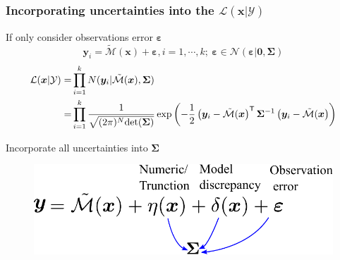 \begin{frame}
\frametitle{Incorporating uncertainties into the $\mathcal{L}(\boldsymbol{x}|\mathcal{Y})$}
    

\begin{block}{If only consider observations error $\boldsymbol{\varepsilon}$}
\begin{equation*}
\boldsymbol{y}_i = \tilde{\mathcal{M}}(\boldsymbol{x})
+ \boldsymbol{\varepsilon}, i=1,\cdots,k; \ \boldsymbol{\varepsilon} \in \mathcal{N}(\boldsymbol{\varepsilon}|\boldsymbol{0},\boldsymbol{\Sigma})
\end{equation*}
\begin{equation*}        
        \label{eq: Likelihood function}
\begin{aligned}
 \mathcal{L}(\boldsymbol{x}|\mathcal{Y}) =& \prod_{i=1}^{k} N(\boldsymbol{y}_i|\tilde{\mathcal{M}}(\boldsymbol{x}),\boldsymbol{\Sigma}) \\
 =& \prod_{i=1}^{k}\frac{1}{\sqrt{(2 \pi)^{N}{\rm{det}} 
 (\boldsymbol{\Sigma})}}\exp\left(-\frac{1}{2}\left(\boldsymbol{y}_i - \tilde{\mathcal{M}}(\boldsymbol{x}\right)^{\mathsf{T}} \boldsymbol{\Sigma}^{-1}\left(\boldsymbol{y}_i - \tilde{\mathcal{M}}(\boldsymbol{x}\right)\right)
\end{aligned}
        \end{equation*}  
\end{block}

\begin{alertblock}{Incorporate all uncertainties into $\boldsymbol{\Sigma}$}
\begin{figure}[!ht]       \includegraphics[scale=0.45]{figures/figure-CoVUncertainty.pdf}
\end{figure}
    
\end{alertblock}


\end{frame}
